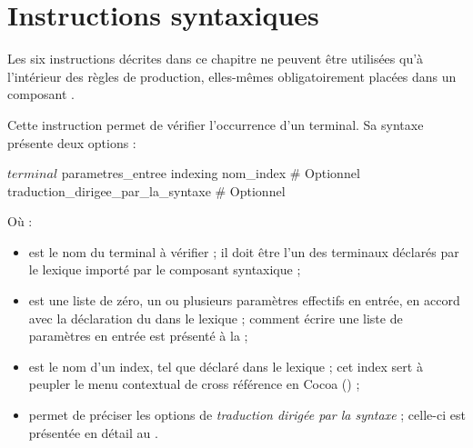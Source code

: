 
\chapter{Instructions syntaxiques}

Les six instructions décrites dans ce chapitre ne peuvent être utilisées qu'à l'intérieur des règles de production, elles-mêmes obligatoirement placées dans un composant .




Cette instruction permet de vérifier l'occurrence d'un terminal. Sa syntaxe présente deux options :
\begin{galgascode}
$terminal$ parametres_entree
indexing nom_index # Optionnel
traduction_dirigee_par_la_syntaxe # Optionnel
\end{galgascode}

Où :
\begin{itemize}
  \item {} est le nom du terminal à vérifier ; il doit être l'un des terminaux déclarés par le lexique importé par le composant syntaxique ;
  \item {} est une liste de zéro, un ou plusieurs paramètres effectifs en entrée, en accord avec la déclaration du  dans le lexique ; comment écrire une liste de paramètres en entrée est présenté à la  ;
  \item {} est le nom d'un index, tel que déclaré dans le lexique ; cet index sert à peupler le menu contextual de cross référence en Cocoa () ;
  \item {} permet de préciser les options de \emph{traduction dirigée par la syntaxe} ; celle-ci est présentée en détail au . 
\end{itemize}






